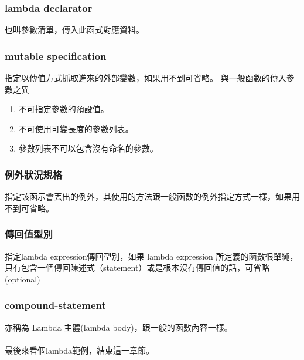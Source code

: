 \subsubsection{lambda declarator}
也叫參數清單，傳入此函式對應資料。
\subsubsection{mutable specification}
指定以傳值方式抓取進來的外部變數，如果用不到可省略。
與一般函數的傳入參數之異
\begin{enumerate}
\item 不可指定參數的預設值。
\item 不可使用可變長度的參數列表。
\item 參數列表不可以包含沒有命名的參數。
\end{enumerate}
\subsubsection{例外狀況規格}
指定該函示會丟出的例外，其使用的方法跟一般函數的例外指定方式一樣，如果用不到可省略。
\subsubsection{傳回值型別}
指定lambda expression傳回型別，如果 lambda expression 所定義的函數很單純，只有包含一個傳回陳述式（statement）或是根本沒有傳回值的話，可省略(optional)
\subsubsection{compound-statement}
亦稱為 Lambda 主體(lambda body)，跟一般的函數內容一樣。\\ \\
最後來看個lambda範例，結束這一章節。

